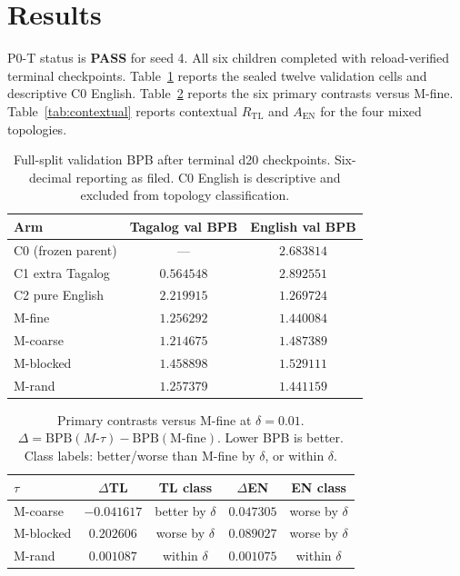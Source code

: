 \documentclass[11pt,a4paper]{article}
\begin{document}
\section{Results}
\label{sec:results}

P0-T status is \textbf{PASS} for seed 4. All six children completed with reload-verified terminal checkpoints. Table~\ref{tab:cells} reports the sealed twelve validation cells and descriptive C0 English. Table~\ref{tab:primary} reports the six primary contrasts versus M-fine. Table~\ref{tab:contextual} reports contextual $R_{\mathrm{TL}}$ and $A_{\mathrm{EN}}$ for the four mixed topologies.

\begin{table}[ht]
\centering
\caption{Full-split validation BPB after terminal d20 checkpoints. Six-decimal reporting as filed. C0 English is descriptive and excluded from topology classification.}
\label{tab:cells}
\begin{tabular}{lcc}
\toprule
Arm & Tagalog val BPB & English val BPB \\
\midrule
C0 (frozen parent) & --- & $2.683814$ \\
C1 extra Tagalog & $0.564548$ & $2.892551$ \\
C2 pure English & $2.219915$ & $1.269724$ \\
M-fine & $1.256292$ & $1.440084$ \\
M-coarse & $1.214675$ & $1.487389$ \\
M-blocked & $1.458898$ & $1.529111$ \\
M-rand & $1.257379$ & $1.441159$ \\
\bottomrule
\end{tabular}
\end{table}

\begin{table}[ht]
\centering
\caption{Primary contrasts versus M-fine at $\delta=0.01$. $\Delta=\mathrm{BPB}(M\textrm{-}\tau)-\mathrm{BPB}(\textrm{M-fine})$. Lower BPB is better. Class labels: better/worse than M-fine by $\delta$, or within $\delta$.}
\label{tab:primary}
\small
\begin{tabular}{lcccc}
\toprule
$\tau$ & $\Delta$TL & TL class & $\Delta$EN & EN class \\
\midrule
M-coarse & $-0.041617$ & better by $\delta$ & $0.047305$ & worse by $\delta$ \\
M-blocked & $0.202606$ & worse by $\delta$ & $0.089027$ & worse by $\delta$ \\
M-rand & $0.001087$ & within $\delta$ & $0.001075$ & within $\delta$ \\
\bottomrule
\end{tabular}
\end{table}
\end{document}
